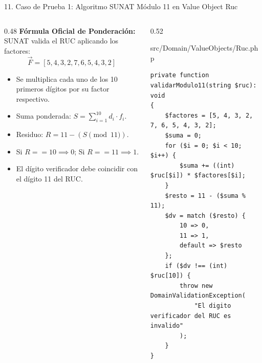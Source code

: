 \documentclass[aspectratio=169,10pt]{beamer}
\begin{document}
\begin{frame}[fragile]{11. Caso de Prueba 1: Algoritmo SUNAT Módulo 11 en Value Object Ruc}
\begin{columns}
\begin{column}{0.48\textwidth}
    \fontsize{6.8pt}{8.2pt}\selectfont\color{textwhite}
    \textbf{Fórmula Oficial de Ponderación:}\\[0.1cm]
    SUNAT valida el RUC aplicando los factores:
    $$\vec{F} = [5, 4, 3, 2, 7, 6, 5, 4, 3, 2]$$
    \begin{itemize}
        \item Se multiplica cada uno de los 10 primeros dígitos por su factor respectivo.
        \item Suma ponderada: $S = \sum_{i=1}^{10} d_i \cdot f_i$.
        \item Residuo: $R = 11 - (S \pmod{11})$.
        \item Si $R == 10 \implies 0$; Si $R == 11 \implies 1$.
        \item El dígito verificador debe coincidir con el dígito 11 del RUC.
    \end{itemize}
\end{column}
\begin{column}{0.52\textwidth}
    \begin{codebox}{src/Domain/ValueObjects/Ruc.php}
\begin{lstlisting}
private function validarModulo11(string $ruc): void 
{
    $factores = [5, 4, 3, 2, 7, 6, 5, 4, 3, 2];
    $suma = 0;
    for ($i = 0; $i < 10; $i++) {
        $suma += ((int) $ruc[$i]) * $factores[$i];
    }
    $resto = 11 - ($suma % 11);
    $dv = match ($resto) {
        10 => 0, 
        11 => 1, 
        default => $resto
    };
    if ($dv !== (int) $ruc[10]) {
        throw new DomainValidationException(
            "El digito verificador del RUC es invalido"
        );
    }
}
\end{lstlisting}
    \end{codebox}
\end{column}
\end{columns}
\end{frame}
\end{document}
